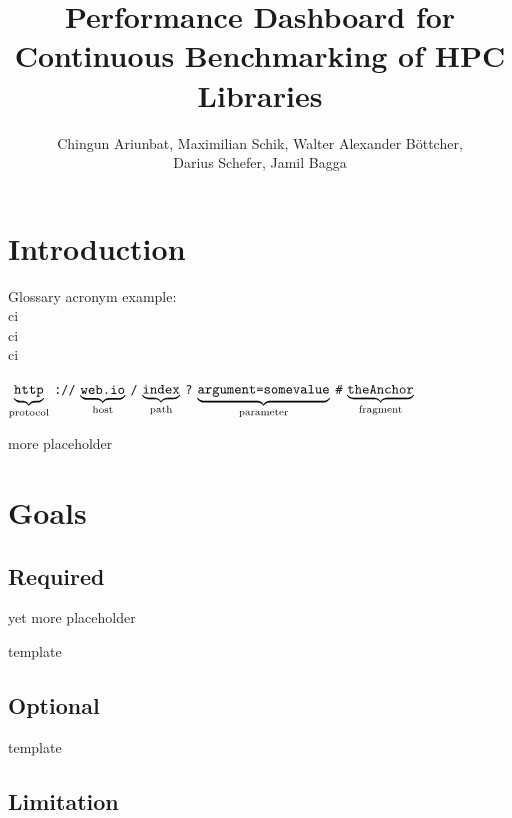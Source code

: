 \documentclass[parskip=full,11pt]{scrartcl}
\title{Performance Dashboard for Continuous Benchmarking of HPC Libraries}
\author{Chingun Ariunbat, Maximilian Schik, Walter Alexander B\"ottcher,\\ Darius Schefer, Jamil Bagga}
\newcommand\urlpart[2]{$\underbrace{\text{\texttt{#1}}}_{\text{#2}}$}
\begin{document}
\maketitle

\section{Introduction}
Glossary acronym example: \\
\acrshort{ci} \\
\acrlong{ci} \\
\acrfull{ci}

\begin{center}
\urlpart{http}{protocol}%
\texttt{://}%
\urlpart{web.io}{host}%
\texttt{/}%
\urlpart{index}{path}%
\texttt{?}%
\urlpart{argument=somevalue}{parameter}%
\texttt{\#}%
\urlpart{theAnchor}{fragment}
\end{center}

more placeholder

\pagebreak
\section{Goals}

\subsection{Required}


yet more placeholder




template

\subsection{Optional}



template

\subsection{Limitation}
\end{document}
